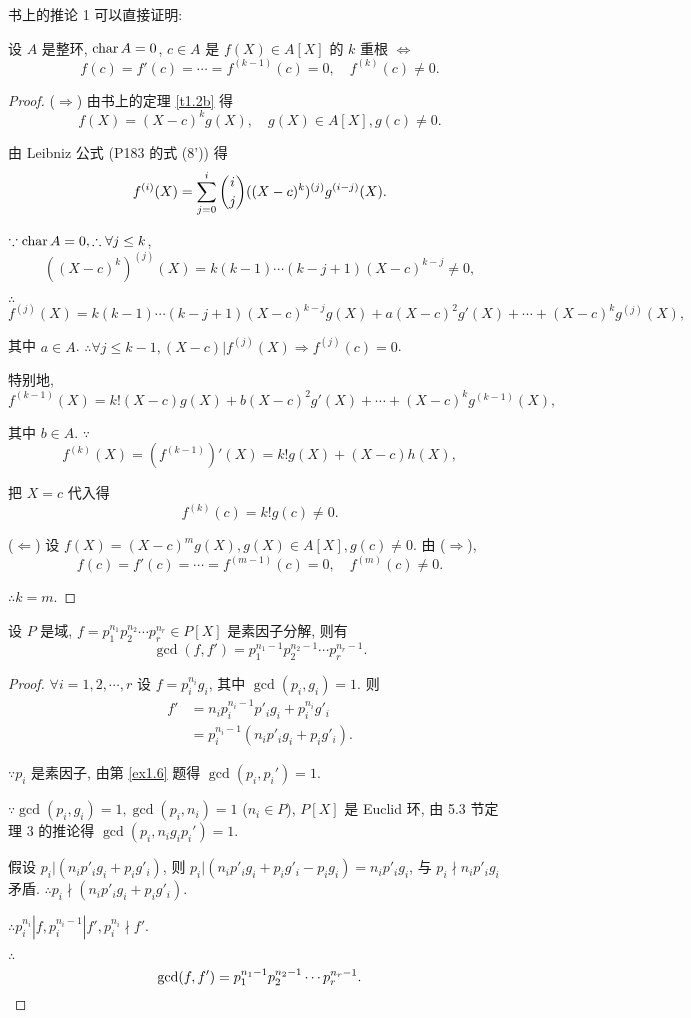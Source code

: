 \documentclass[UTF8]{ctexart}
\begin{document}
书上的推论 1 可以直接证明:
\begin{theorem}[书上的推论 1]
    设 $A$ 是整环, $\operatorname{char} A=0$, $c\in A$ 是 $f(X)\in A[X]$ 的 $k$ 重根 $\Leftrightarrow$
    \[f(c)=f'(c)=\cdots=f^{(k-1)}(c)=0,\quad f^{(k)}(c)\neq0.\]
\end{theorem}
\begin{proof}
    ($\Rightarrow$) 由书上的定理 \ref{t1.2b} 得
    \[f(X)=(X-c)^kg(X),\quad g(X)\in A[X],g(c)\neq0.\]

    由 Leibniz 公式 (P183 的式 (8')) 得
    \[f^{(i)}(X)=\sum\limits_{j=0}^i\dbinom{i}{j}((X-c)^k)^{(j)}g^{(i-j)}(X).\]

    $\because\operatorname{char} A=0,\therefore\forall j\leq k$,
    \[((X-c)^k)^{(j)}(X)=k(k-1)\cdots(k-j+1)(X-c)^{k-j}\neq0,\]

    $\therefore$
    \[f^{(j)}(X)=k(k-1)\cdots(k-j+1)(X-c)^{k-j}g(X)+a(X-c)^2g'(X)+\cdots+(X-c)^kg^{(j)}(X),\]

    其中 $a\in A$.
    $\therefore\forall j\leq k-1,(X-c)|f^{(j)}(X)\Rightarrow f^{(j)}(c)=0$.

    特别地,
    \[f^{(k-1)}(X)=k!(X-c)g(X)+b(X-c)^2g'(X)+\cdots+(X-c)^kg^{(k-1)}(X),\]

    其中 $b\in A$. $\because$
    \[f^{(k)}(X)=(f^{(k-1)})'(X)=k!g(X)+(X-c)h(X),\]

    把 $X=c$ 代入得
    \[f^{(k)}(c)=k!g(c)\neq0.\]

    ($\Leftarrow$) 设 $f(X)=(X-c)^mg(X),g(X)\in A[X],g(c)\neq0$. 由 ($\Rightarrow$),
    \[f(c)=f'(c)=\cdots=f^{(m-1)}(c)=0,\quad f^{(m)}(c)\neq0.\]

    $\therefore k=m$.
\end{proof}
\begin{theorem}[书上的推论 2]
    设 $P$ 是域, $f=p_1^{n_1}p_2^{n_2}\cdots p_r^{n_r}\in P[X]$ 是素因子分解, 则有
    \[\gcd(f,f')=p_1^{n_1-1}p_2^{n_2-1}\cdots p_r^{n_r-1}.\]
\end{theorem}
\begin{proof}
    $\forall i=1,2,\cdots,r$ 设 $f=p_i^{n_i}g_i$, 其中 $\gcd(p_i,g_i)=1$. 则
    \begin{align*}
        f' & =n_ip_i^{n_i-1}p'_ig_i+p_i^{n_i}g'_i \\
        & =p_i^{n_i-1}(n_ip'_ig_i+p_ig'_i).
    \end{align*}

    $\because p_i$ 是素因子, 由第 \ref{ex1.6} 题得 $\gcd(p_i,p_i')=1$.

    $\because\gcd(p_i,g_i)=1,\gcd(p_i,n_i)=1$ ($n_i\in P$), $P[X]$ 是 Euclid 环, 由 5.3 节定理 3 的推论得 $\gcd(p_i,n_ig_ip_i')=1$.

    假设 $p_i|(n_ip'_ig_i+p_ig'_i)$, 则 $p_i|(n_ip'_ig_i+p_ig'_i-p_ig_i)=n_ip'_ig_i$, 与 $p_i\nmid n_ip'_ig_i$ 矛盾. $\therefore p_i\nmid(n_ip'_ig_i+p_ig'_i)$.

    $\therefore p_i^{n_i}|f,p_i^{n_i-1}|f',p_i^{n_i}\nmid f'$.

    $\therefore$
    \[\gcd(f,f')=p_1^{n_1-1}p_2^{n_2-1}\cdots p_r^{n_r-1}.\qedhere\]
\end{proof}
\end{document}
